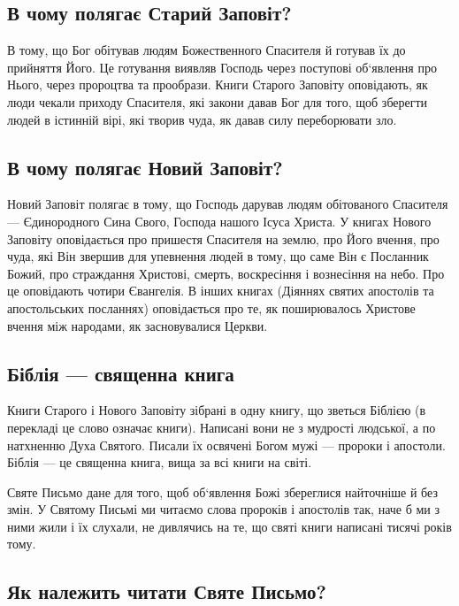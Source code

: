 \documentclass[main.tex]{subfiles}
\begin{document}
\subsection{В чому полягає Старий Заповіт?}

В тому, що Бог обітував людям Божественного Спасителя й готував їх до прийняття Його. Це готування виявляв Господь через поступові об`явлення про Нього, через пророцтва та прообрази. Книги Старого Заповіту оповідають, як люди чекали приходу Спасителя, які закони давав Бог для того, щоб зберегти людей в істинній вірі, які творив чуда, як давав силу переборювати зло.

\subsection{В чому полягає Новий Заповіт?}

Новий Заповіт полягає в тому, що Господь дарував людям обітованого Спасителя — Єдинородного Сина Свого, Господа нашого Ісуса Христа. У книгах Нового Заповіту оповідається про пришестя Спасителя на землю, про Його вчення, про чуда, які Він звершив для упевнення людей в тому, що саме Він є Посланник Божий, про страждання Христові, смерть, воскресіння і вознесіння на небо. Про це оповідають чотири Євангелія. В інших книгах (Діяннях святих апостолів та апостольських посланнях) оповідається про те, як поширювалось Христове вчення між народами, як засновувалися Церкви.

\subsection{Біблія — священна книга}

Книги Старого і Нового Заповіту зібрані в одну книгу, що зветься Біблією (в перекладі це слово означає книги). Написані вони не з мудрості людської, а по натхненню Духа Святого. Писали їх освячені Богом мужі — пророки і апостоли. Біблія — це священна книга, вища за всі книги на світі.

Святе Письмо дане для того, щоб об`явлення Божі збереглися найточніше й без змін. У Святому Письмі ми читаємо слова пророків і апостолів так, наче б ми з ними жили і їх слухали, не дивлячись на те, що святі книги написані тисячі років тому.
 
\subsection{Як належить читати Святе Письмо?}
\end{document}
